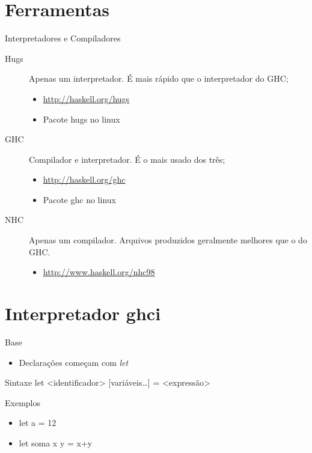 \documentclass{beamer}
\begin{document}
\section{Ferramentas}

	\begin{frame}{Interpretadores e Compiladores}
	 
	 \begin{description}
	  \item [Hugs] Apenas um interpretador. É mais rápido que o interpretador do GHC;
			\begin{itemize}
			 \item \url{http://haskell.org/hugs}
			 \item Pacote hugs no linux
			\end{itemize}
	  \item [GHC] Compilador e interpretador. É o mais usado dos três;
			\begin{itemize}
			 \item \url{http://haskell.org/ghc}
			 \item Pacote ghc no linux
			\end{itemize}
	  \item [NHC] Apenas um compilador. Arquivos produzidos geralmente melhores que o do GHC.
			\begin{itemize}
			 \item \url{http://www.haskell.org/nhc98}
			\end{itemize}
	 \end{description}	 
	\end{frame}
	
\section{Interpretador ghci}

	\begin{frame}{Base}
	 	 \begin{itemize}
	 	  \item Declarações começam com \textit{let}
	 	 \end{itemize}
	 	 \begin{block}{Sintaxe}
	 	  let <identificador> {[}variáveis\dots{]} = <expressão>
	 	 \end{block}
	 	 \begin{block}{Exemplos}
	 	  \begin{itemize}
	 	   \item let a = 12
	 	   \item let soma x y = x+y
	 	  \end{itemize}
	 	 \end{block}
	\end{frame}
	
\end{document}
